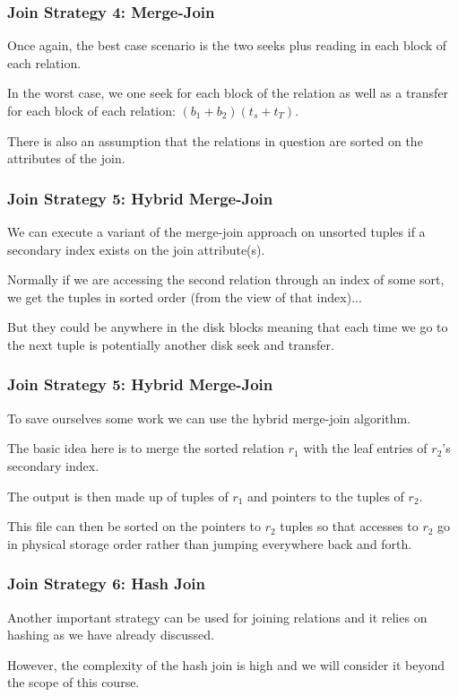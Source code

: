 \begin{frame}
\frametitle{Join Strategy 4: Merge-Join}

Once again, the best case scenario is the two seeks plus reading in each block of each relation. 

In the worst case, we one seek for each block of the relation as well as a transfer for each block of each relation: $(b_{1} + b_{2})(t_{s} + t_{T})$.

There is also an assumption that the relations in question are sorted on the attributes of the join. 


\end{frame}

\begin{frame}
\frametitle{Join Strategy 5: Hybrid Merge-Join}

We can execute a variant of the merge-join approach on unsorted tuples if a secondary index exists on the join attribute(s). 

Normally if we are accessing the second relation through an index of some sort, we get the tuples in sorted order (from the view of that index)...

But they could be anywhere in the disk blocks meaning that each time we go to the next tuple is potentially another disk seek and transfer.

\end{frame}

\begin{frame}
\frametitle{Join Strategy 5: Hybrid Merge-Join}

To save ourselves some work we can use the hybrid merge-join algorithm.

The basic idea here is to merge the sorted relation $r_{1}$ with the leaf entries of $r_{2}$'s secondary index. 

The output is then made up of tuples of $r_{1}$ and pointers to the tuples of $r_{2}$. 

This file can then be sorted on the pointers to $r_{2}$ tuples so that accesses to $r_{2}$ go in physical storage order rather than jumping everywhere back and forth.

\end{frame}


\begin{frame}
\frametitle{Join Strategy 6: Hash Join}

Another important strategy can be used for joining relations and it relies on hashing as we have already discussed. 

However, the complexity of the hash join is high and we will consider it beyond the scope of this course.

\end{frame}



